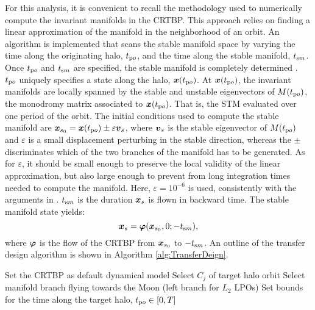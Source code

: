 \begin{figure*}[b!]
For this analysis, it is convenient to recall the methodology used to numerically compute the invariant manifolds in the CRTBP. This approach relies on finding a linear approximation of the manifold in the neighborhood of an orbit. An algorithm is implemented that scans the stable manifold space by varying the time along the originating halo, $t_{\textrm po}$, and the time along the stable manifold, $t_{\textrm sm}$. Once $t_{\textrm po}$ and $t_{\textrm sm}$ are specified, the stable manifold is completely determined \cite{topputo2016fastmanifolds}. $t_{\textrm po}$ uniquely specifies a state along the halo, $\boldsymbol{x}(t_{\textrm po})$. At $\boldsymbol{x}(t_{\textrm po})$, the invariant manifolds are locally spanned by the stable and unstable eigenvectors of $M(t_{\textrm po})$, the monodromy matrix associated to $\boldsymbol{x}(t_{\textrm po})$. That is, the STM evaluated over one period of the orbit. The initial conditions used to compute the stable manifold are $\boldsymbol{x}_{s_0} = \boldsymbol{x}(t_{\textrm po})\pm\varepsilon \boldsymbol{v}_s$, where $\boldsymbol{v}_s$ is the stable eigenvector of $M(t_{\textrm po})$ and $\varepsilon$ is a small displacement perturbing in the stable direction, whereas the $\pm$ discriminates which of the two branches of the manifold has to be generated. As for $\varepsilon$, it should be small enough to preserve the local validity of the linear approximation, but also large enough to prevent from long integration times needed to compute the manifold. Here, $\varepsilon=10^{-6}$ is used, consistently with the arguments in \textcite{gomez1993study}. $t_{\textrm sm}$ is the duration $\boldsymbol{x}_s$ is flown in backward time. The stable manifold state yields:
%
\begin{equation}
\label{eq:stablemanifoldstate}
\boldsymbol{x}_s = \boldsymbol{\varphi}(\boldsymbol{x}_{s_0},0;-t_{\textrm sm}),
\end{equation}
%
where $\boldsymbol{\varphi}$ is the flow of the CRTBP from $\boldsymbol{x}_{s_0}$ to $-t_{\textrm sm}$. An outline of the transfer design algorithm is shown in Algorithm \ref{alg:TransferDeign}.
%
\begin{algorithm}[!b]
	\caption{Transfer design.}\label{alg:TransferDeign}
	\begin{algorithmic}[]
		\State Set the CRTBP as default dynamical model
		\State Select $C_j$ of target halo orbit 
		\State Select manifold branch flying towards the Moon (\ie left branch for $L_2$ LPOs)
		\EndProcedure
		\State Set bounds for the time along the target halo, $t_{\textrm po}\in\left[0,T\right]$ 

\end{algorithmic}
\end{algorithm}
\end{figure*}
